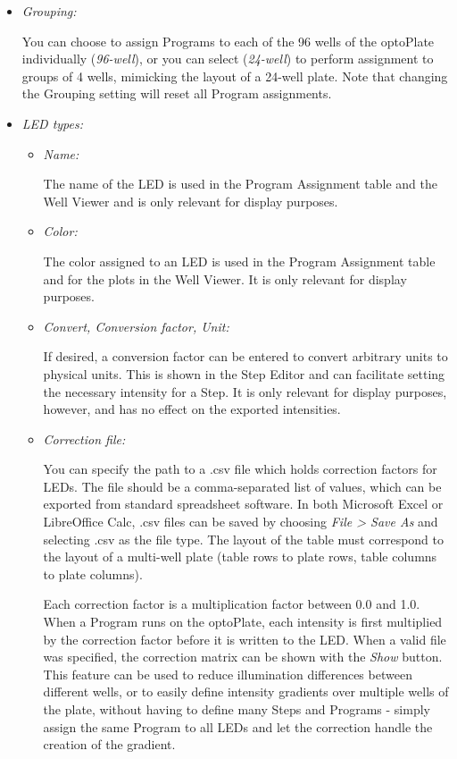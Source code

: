 \begin{itemize}
\item
  \emph{Grouping:}

  You can choose to assign Programs to each of the 96 wells of the
  optoPlate individually (\emph{96-well}), or you can select
  (\emph{24-well}) to perform assignment to groups of 4 wells, mimicking
  the layout of a 24-well plate. Note that changing the Grouping setting
  will reset all Program assignments.
\item
  \emph{LED types:}

  \begin{itemize}
  \item
    \emph{Name:}

    The name of the LED is used in the Program Assignment table and the
    Well Viewer and is only relevant for display purposes.
  \item
    \emph{Color:}

    The color assigned to an LED is used in the Program Assignment table
    and for the plots in the Well Viewer. It is only relevant for
    display purposes.
  \item
    \emph{Convert, Conversion factor, Unit:}

    If desired, a conversion factor can be entered to convert arbitrary
    units to physical units. This is shown in the Step Editor and can
    facilitate setting the necessary intensity for a Step. It is only
    relevant for display purposes, however, and has no effect on the
    exported intensities.
  \item
    \emph{Correction file:}

    You can specify the path to a .csv file which holds correction
    factors for LEDs. The file should be a comma-separated list of
    values, which can be exported from standard spreadsheet software. In
    both Microsoft Excel or LibreOffice Calc, .csv files can be saved by
    choosing \emph{File \textgreater{} Save As} and selecting .csv as
    the file type. The layout of the table must correspond to the layout
    of a multi-well plate (table rows to plate rows, table columns to
    plate columns).

    Each correction factor is a multiplication factor between 0.0 and
    1.0. When a Program runs on the optoPlate, each intensity is first
    multiplied by the correction factor before it is written to the LED.
    When a valid file was specified, the correction matrix can be shown
    with the \emph{Show} button. This feature can be used to reduce
    illumination differences between different wells, or to easily
    define intensity gradients over multiple wells of the plate, without
    having to define many Steps and Programs - simply assign the same
    Program to all LEDs and let the correction handle the creation of
    the gradient.


\end{itemize}
\end{itemize}
